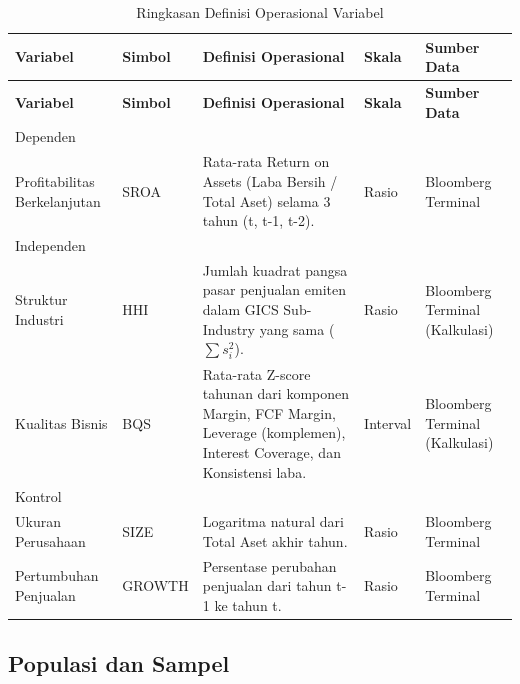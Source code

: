 \documentclass[12pt,a4paper]{article}
\begin{document}
\begin{longtable}{>{\raggedright\arraybackslash}p{} >{\raggedright\arraybackslash}p{} >{\raggedright\arraybackslash}p{} >{\raggedright\arraybackslash}p{} >{\raggedright\arraybackslash}p{}}
\caption{Ringkasan Definisi Operasional Variabel}\label{tab:definisi-operasional}\\
\toprule
\textbf{Variabel} & \textbf{Simbol} & \textbf{Definisi Operasional} & \textbf{Skala} & \textbf{Sumber Data} \\
\midrule
\endfirsthead
\toprule
\textbf{Variabel} & \textbf{Simbol} & \textbf{Definisi Operasional} & \textbf{Skala} & \textbf{Sumber Data} \\
\midrule
\endhead
Dependen & & & & \\
Profitabilitas Berkelanjutan & SROA & Rata-rata Return on Assets (Laba Bersih / Total Aset) selama 3 tahun (t, t-1, t-2). & Rasio & Bloomberg Terminal \\
Independen & & & & \\
Struktur Industri & HHI & Jumlah kuadrat pangsa pasar penjualan emiten dalam GICS Sub-Industry yang sama ($\sum s_i^2$). & Rasio & Bloomberg Terminal (Kalkulasi) \\
Kualitas Bisnis & BQS & Rata-rata Z-score tahunan dari komponen Margin, FCF Margin, Leverage (komplemen), Interest Coverage, dan Konsistensi laba. & Interval & Bloomberg Terminal (Kalkulasi) \\
Kontrol & & & & \\
Ukuran Perusahaan & SIZE & Logaritma natural dari Total Aset akhir tahun. & Rasio & Bloomberg Terminal \\
Pertumbuhan Penjualan & GROWTH & Persentase perubahan penjualan dari tahun t-1 ke tahun t. & Rasio & Bloomberg Terminal \\
\bottomrule
\end{longtable}

\subsection{Populasi dan Sampel}\label{populasi-dan-sampel}
\end{document}
